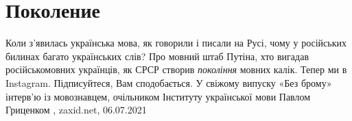  
 
 
 
 
\chapter{Поколение}
\label{sec:slova.pokolenie}

Коли з’явилась українська мова, як говорили і писали на Русі, чому у російських
билинах багато українських слів? Про мовний штаб Путіна, хто вигадав
російськомовних українців, як СРСР створив \emph{покоління} мовних калік.
Тепер ми в Instagram. Підписуйтеся, Вам сподобається.  У свіжому випуску «Без
брому» інтерв’ю із мовознавцем, очільником Інституту української мови Павлом
Гриценком
, 
zaxid.net, 06.07.2021

